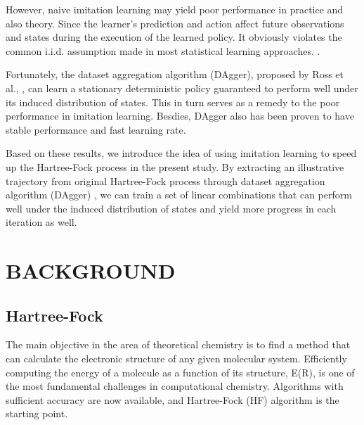 \documentclass[twoside]{article}
\begin{document}


However, naive imitation learning may yield poor performance in practice and also theory.  Since the learner's prediction and action affect future observations and states during the execution of the learned policy. It obviously violates the common i.i.d. assumption made in most statistical learning approaches. \cite{Ross}.



Fortunately, the dataset aggregation algorithm (DAgger), proposed by Ross et al., \cite{DAgger}, can learn a stationary deterministic policy guaranteed to perform well under its induced distribution of states. This in turn serves as a remedy to the poor performance in imitation learning. Besdies, DAgger also has been proven to have stable performance and fast learning rate. \cite{DAggerCompare}

Based on these results, we introduce the idea of using imitation learning to speed up the Hartree-Fock process in the present study. By extracting an illustrative trajectory from original Hartree-Fock process
through dataset aggregation algorithm (DAgger) \cite{DAgger}, we can train a set of linear combinations that can perform well under the induced distribution of states and yield more progress in each iteration as well. 


\section{BACKGROUND}

\subsection{Hartree-Fock}



The main objective in the area of theoretical chemistry is to find a method that can calculate the electronic structure of any given molecular system. Efficiently computing the energy of a molecule as a function of its structure, E(R), is one of the most fundamental challenges in computational chemistry. Algorithms with sufficient accuracy are now available, and Hartree-Fock (HF) algorithm is the starting point.
\end{document}
